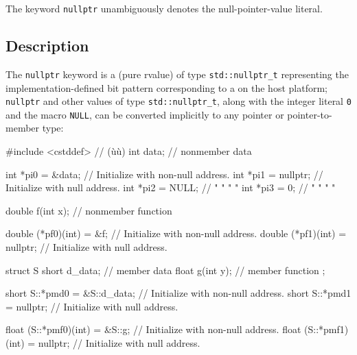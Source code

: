
\setcounter{table}{0}
\setcounter{footnote}{0}
\setcounter{lstlisting}{0}



The keyword \lstinline!nullptr! unambiguously denotes the
null-pointer-value literal.

\subsection[Description]{Description}\label{description}

The \lstinline!nullptr! keyword is a  (pure rvalue) of type
\lstinline!std::nullptr_t! representing the implementation-defined
bit pattern corresponding to a  on the host platform;
\lstinline!nullptr! and other values of type \lstinline!std::nullptr_t!, along with the integer literal \lstinline!0! and the macro \lstinline!NULL!, can be converted implicitly to any pointer or pointer-to-member type:

\begin{emcppslisting}
#include <cstddef> // (ù{}ù)
int data;  // nonmember data

int *pi0 = &data;    // Initialize with non-null address.
int *pi1 = nullptr;  // Initialize with null address.
int *pi2 = NULL;     //  "          "    "    "
int *pi3 = 0;        //  "          "    "    "

double f(int x);  // nonmember function

double (*pf0)(int) = &f;       // Initialize with non-null address.
double (*pf1)(int) = nullptr;  // Initialize with null address.

struct S
{
    short d_data;    // member data
    float g(int y);  // member function
};

short S::*pmd0 = &S::d_data;  // Initialize with non-null address.
short S::*pmd1 = nullptr;     // Initialize with null address.

float (S::*pmf0)(int) = &S::g;    // Initialize with non-null address.
float (S::*pmf1)(int) = nullptr;  // Initialize with null address.
\end{emcppslisting}


